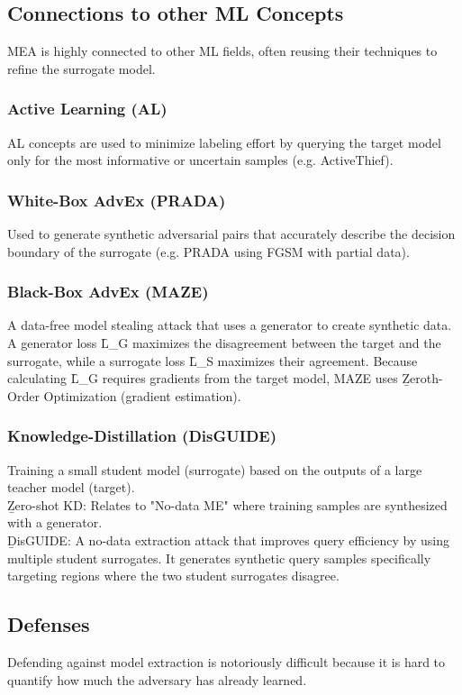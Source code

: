 \subsection{Connections to other ML Concepts}
MEA is highly connected to other ML fields, often reusing their techniques to refine the surrogate model.

\subsubsection{Active Learning (AL)}
AL concepts are used to minimize labeling effort by querying the target model only for the most informative or uncertain samples (e.g. ActiveThief).

\subsubsection{White-Box AdvEx (PRADA)}
Used to generate synthetic adversarial pairs that accurately describe the decision boundary of the surrogate (e.g. PRADA using FGSM with partial data).

\subsubsection{Black-Box AdvEx (MAZE)}
A data-free model stealing attack that uses a generator to create synthetic data. A generator loss \f{L_G} maximizes the disagreement between the target and the surrogate, while a surrogate loss \f{L_S} maximizes their agreement. Because calculating \f{L_G} requires gradients from the target model, MAZE uses \b{Zeroth-Order Optimization} (gradient estimation).

\subsubsection{Knowledge-Distillation (DisGUIDE)}
Training a small student model (surrogate) based on the outputs of a large teacher model (target).\\[.5em]
\b{Zero-shot KD}: Relates to "No-data ME" where training samples are synthesized with a generator.\\[.5em]
\b{DisGUIDE}: A no-data extraction attack that improves query efficiency by using multiple student surrogates. It generates synthetic query samples specifically targeting regions where the two student surrogates disagree.



\subsection{Defenses}
Defending against model extraction is notoriously difficult because it is hard to quantify how much the adversary has already learned.

